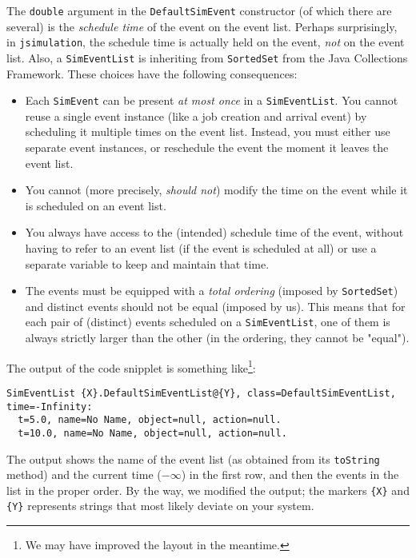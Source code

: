 The \lstinline{double} argument in the \lstinline{DefaultSimEvent} constructor
  (of which there are several)
  is the {\em schedule time\/} of the event on the event list.
Perhaps surprisingly,
  in \lstinline{jsimulation},
  the schedule time is actually held on the event,
 {\em not\/} on the event list.
Also, a \lstinline{SimEventList} is inheriting from \lstinline{SortedSet}
  from the Java Collections Framework.
These choices have the following consequences:
\begin{itemize}
  \item Each \lstinline{SimEvent} can be present {\em at most once\/} in a \lstinline{SimEventList}.
        You cannot reuse a single event instance (like a job creation and arrival event)
          by scheduling it multiple times on the event list.
        Instead, you must either use separate event instances, or reschedule the event
          the moment it leaves the event list.
  \item You cannot (more precisely, {\em should not\/}) modify the time on the event while it is
          scheduled on an event list.
  \item You always have access to the (intended) schedule time of the event, without having to
          refer to an event list (if the event is scheduled at all) or use a separate
          variable to keep and maintain that time.
  \item The events must be equipped with a {\em total ordering\/} (imposed by \lstinline{SortedSet})
          and distinct events should not be equal (imposed by us).
          This means that for each pair of (distinct) events scheduled on a \lstinline{SimEventList},
          one of them is always strictly larger than the other
          (in the ordering, they cannot be "equal").
\end{itemize}

The output of the code snipplet is something like\footnote{
We may have improved the layout in the meantime.}:
\begin{lstlisting}[basicstyle=\tiny]
SimEventList {X}.DefaultSimEventList@{Y}, class=DefaultSimEventList, time=-Infinity:
  t=5.0, name=No Name, object=null, action=null.
  t=10.0, name=No Name, object=null, action=null.
\end{lstlisting}
The output shows the name of the event list (as obtained from its \lstinline{toString} method)
  and the current time ($-\infty$) in the first row, and then the events in the list
  in the proper order.
By the way, we modified the output; the markers \lstinline|{X}| and \lstinline|{Y}|
  represents strings that most likely deviate on your system.

